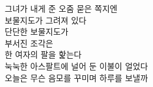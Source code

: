 그녀가 내게 준 오줌 묻은 쪽지엔\\

보물지도가 그려져 있다\\

단단한 보물지도가\\

부서진 조각은\\

한 여자의 팔을 핥는다\\

눅눅한 아스팔트에 널어 둔 이불이 얼었다\\

오늘은 무슨 음모를 꾸미며 하루를 보낼까

